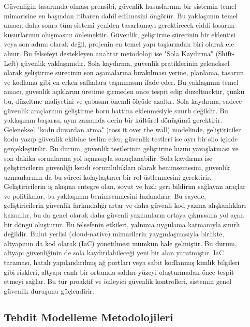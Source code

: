 Güvenliğin tasarımda olması prensibi, güvenlik hususlarının bir sistemin temel mimarisine en başından itibaren dahil edilmesini öngörür. Bu yaklaşımın temel amacı, daha sonra tüm sistemi yeniden tasarlamayı gerektirecek ciddi tasarım kusurlarının oluşmasını önlemektir. Güvenlik, geliştirme sürecinin bir eklentisi veya son adımı olarak değil, projenin en temel yapı taşlarından biri olarak ele alınır.
Bu felsefeyi destekleyen anahtar metodoloji ise "Sola Kaydırma" (Shift-Left) güvenlik yaklaşımıdır. Sola kaydırma, güvenlik pratiklerinin geleneksel olarak geliştirme sürecinin son aşamalarına bırakılması yerine, planlama, tasarım ve kodlama gibi en erken safhalara taşınmasını ifade eder. Bu yaklaşımın temel amacı, güvenlik açıklarını üretime girmeden önce tespit edip düzeltmektir, çünkü bu, düzeltme maliyetini ve çabasını önemli ölçüde azaltır.
Sola kaydırma, sadece güvenlik araçlarının geliştirme boru hattına eklenmesiyle sınırlı değildir. Bu yaklaşımın başarısı, aynı zamanda derin bir kültürel dönüşümü gerektirir. Geleneksel "kodu duvardan atma" (toss it over the wall) modelinde, geliştiriciler kodu yazıp güvenlik ekibine teslim eder, güvenlik testleri ise ayrı bir silo içinde gerçekleştirilir. Bu durum, güvenlik testlerinin geliştirme hızını yavaşlatması ve son dakika sorunlarına yol açmasıyla sonuçlanabilir. Sola kaydırma ise geliştiricilerin güvenliği kendi sorumlulukları olarak benimsemesini, güvenlik uzmanlarının da bu süreci kolaylaştırıcı bir rol üstlenmesini gerektirir. Geliştiricilerin iş akışına entegre olan, soyut ve hızlı geri bildirim sağlayan araçlar ve politikalar, bu yaklaşımın benimsenmesini hızlandırır. Bu sayede, geliştiricilerin güvenlik farkındalığı artar ve daha güvenli kod yazma alışkanlıkları kazanılır, bu da genel olarak daha güvenli yazılımların ortaya çıkmasına yol açan bir döngü oluşturur.
Bu felsefenin etkileri, yalnızca uygulama katmanıyla sınırlı değildir. Bulut yerlisi (cloud-native) mimarilerin yaygınlaşmasıyla birlikte, altyapının da kod olarak (IaC) yönetilmesi mümkün hale gelmiştir. Bu durum, altyapı güvenliğinin de sola kaydırılabileceği yeni bir alan yaratmıştır. IaC taraması, hatalı yapılandırılmış ağ portları veya sabit kodlanmış kimlik bilgileri gibi riskleri, altyapı canlı bir ortamda saldırı yüzeyi oluşturmadan önce tespit etmeyi sağlar. Bu tür proaktif ve önleyici güvenlik kontrolleri, sistemin genel güvenlik duruşunu güçlendirir.

\subsection{Tehdit Modelleme Metodolojileri}

